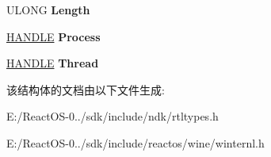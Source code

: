 \begin{DoxyCompactItemize}
\item 
\mbox{\label{struct___r_t_l___u_s_e_r___p_r_o_c_e_s_s___i_n_f_o_r_m_a_t_i_o_n_a2d21e4880dd4083e10f3865c71c2dab8}} 
U\+L\+O\+NG {\bfseries Length}
\item 
\mbox{\label{struct___r_t_l___u_s_e_r___p_r_o_c_e_s_s___i_n_f_o_r_m_a_t_i_o_n_aae3d184c0eb40712a661724d4e0c4f9c}} 
\hyperlink{interfacevoid}{H\+A\+N\+D\+LE} {\bfseries Process}
\item 
\mbox{\label{struct___r_t_l___u_s_e_r___p_r_o_c_e_s_s___i_n_f_o_r_m_a_t_i_o_n_ad6bdb096fcd5f9e69b6837b7d084034e}} 
\hyperlink{interfacevoid}{H\+A\+N\+D\+LE} {\bfseries Thread}
\end{DoxyCompactItemize}


该结构体的文档由以下文件生成\+:\begin{DoxyCompactItemize}
\item 
E\+:/\+React\+O\+S-\/0../sdk/include/ndk/rtltypes.\+h\item 
E\+:/\+React\+O\+S-\/0../sdk/include/reactos/wine/winternl.\+h\end{DoxyCompactItemize}
